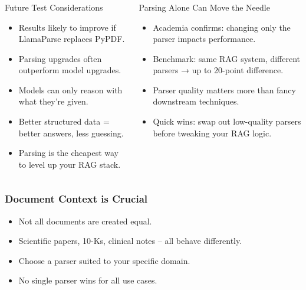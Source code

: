\begin{frame}[fragile]\frametitle{}
\begin{columns}
    \begin{column}[T]{0.5\linewidth}
		Future Test Considerations
		  \begin{itemize}
			\item Results likely to improve if LlamaParse replaces PyPDF.
			\item Parsing upgrades often outperform model upgrades.
			\item Models can only reason with what they’re given.
			\item Better structured data = better answers, less guessing.
			\item Parsing is the cheapest way to level up your RAG stack.
		  \end{itemize}

    \end{column}
    \begin{column}[T]{0.5\linewidth}  
  
		Parsing Alone Can Move the Needle
		  \begin{itemize}
			\item Academia confirms: changing only the parser impacts performance.
			\item Benchmark: same RAG system, different parsers → up to 20-point difference.
			\item Parser quality matters more than fancy downstream techniques.
			\item Quick wins: swap out low-quality parsers before tweaking your RAG logic.
		  \end{itemize}
    \end{column}
  \end{columns}  
   
\end{frame}

\begin{frame}[fragile]\frametitle{Document Context is Crucial}
  \begin{itemize}
    \item Not all documents are created equal.
    \item Scientific papers, 10-Ks, clinical notes – all behave differently.
    \item Choose a parser suited to your specific domain.
    \item No single parser wins for all use cases.
  \end{itemize}
\end{frame}

